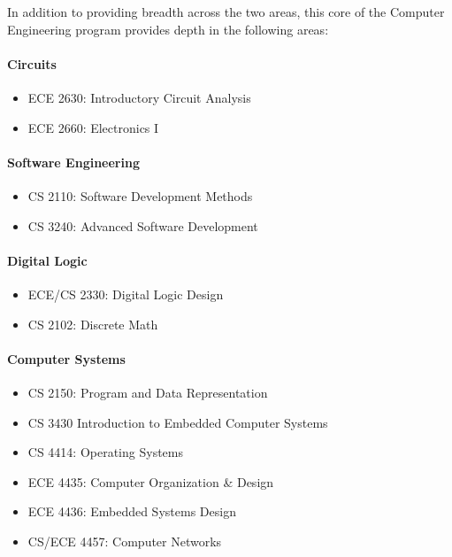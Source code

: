 \documentclass[10pt,letter]{book}
\newenvironment{itemlist}{
\begin{itemize}
\setlength{\itemsep}{0pt}
\setlength{\parskip}{0pt}}
{\end{itemize}}
\begin{document}

In addition to providing breadth across the two areas,
this core of the Computer Engineering program provides
depth in the following areas:

\paragraph{Circuits}
\begin{itemlist}
\item ECE 2630: Introductory Circuit Analysis
\item ECE 2660: Electronics I
\end{itemlist}

\paragraph{Software Engineering}
\begin{itemlist}
\item CS 2110: Software Development Methods
\item CS 3240: Advanced Software Development
\end{itemlist}

\paragraph{Digital Logic}
\begin{itemlist}
\item ECE/CS 2330: Digital Logic Design
\item CS 2102: Discrete Math
\end{itemlist}

\paragraph{Computer Systems}
\begin{itemlist}
\item CS 2150: Program and Data Representation
\item CS 3430 Introduction to Embedded Computer Systems
\item CS 4414: Operating Systems
\item ECE 4435: Computer Organization \& Design
\item ECE 4436: Embedded Systems Design
\item CS/ECE 4457: Computer Networks
\end{itemlist}
\end{document}
